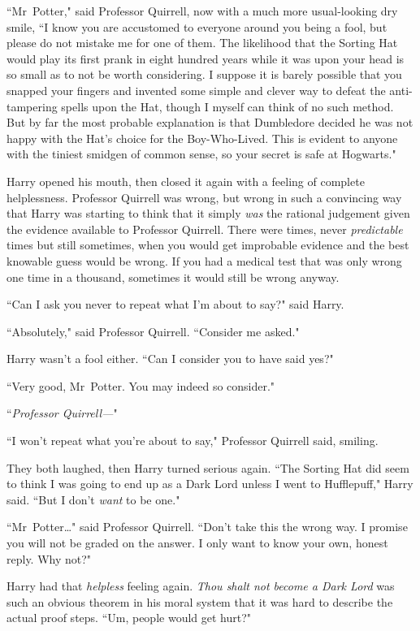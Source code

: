 ``Mr~Potter," said Professor Quirrell, now with a much more usual-looking dry smile, ``I know you are accustomed to everyone around you being a fool, but please do not mistake me for one of them. The likelihood that the Sorting Hat would play its first prank in eight hundred years while it was upon your head is so small as to not be worth considering. I suppose it is barely possible that you snapped your fingers and invented some simple and clever way to defeat the anti-tampering spells upon the Hat, though I myself can think of no such method. But by far the most probable explanation is that Dumbledore decided he was not happy with the Hat's choice for the Boy-Who-Lived. This is evident to anyone with the tiniest smidgen of common sense, so your secret is safe at Hogwarts."

Harry opened his mouth, then closed it again with a feeling of complete helplessness. Professor Quirrell was wrong, but wrong in such a convincing way that Harry was starting to think that it simply \emph{was} the rational judgement given the evidence available to Professor Quirrell. There were times, never \emph{predictable} times but still sometimes, when you would get improbable evidence and the best knowable guess would be wrong. If you had a medical test that was only wrong one time in a thousand, sometimes it would still be wrong anyway.

``Can I ask you never to repeat what I'm about to say?" said Harry.

``Absolutely," said Professor Quirrell. ``Consider me asked."

Harry wasn't a fool either. ``Can I consider you to have said yes?"

``Very good, Mr~Potter. You may indeed so consider."

``\emph{Professor Quirrell—}"

``I won't repeat what you're about to say," Professor Quirrell said, smiling.

They both laughed, then Harry turned serious again. ``The Sorting Hat did seem to think I was going to end up as a Dark Lord unless I went to Hufflepuff," Harry said. ``But I don't \emph{want} to be one."

``Mr~Potter…" said Professor Quirrell. ``Don't take this the wrong way. I promise you will not be graded on the answer. I only want to know your own, honest reply. Why not?"

Harry had that \emph{helpless} feeling again. \emph{Thou shalt not become a Dark Lord} was such an obvious theorem in his moral system that it was hard to describe the actual proof steps. ``Um, people would get hurt?"

